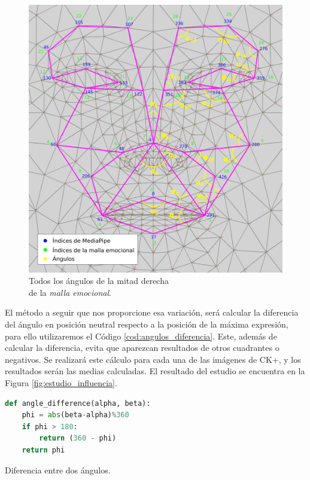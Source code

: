 \begin{figure} [h!]
  \begin{center}
    \includegraphics[width=13cm]{figs/emotional_mesh_todos_angulos.png}
  \end{center}
  \captionsetup{justification=centering}
  \caption{Todos los ángulos de la mitad derecha\\
  de la \textit{malla emocional}.}
  \label{fig:emotional_mesh_todos_angulos}
\end{figure}

El método a seguir que nos proporcione esa variación, será calcular la diferencia del ángulo en posición neutral respecto a la posición de la máxima expresión, para ello utilizaremos el Código \ref{cod:angulos_diferencia}. Este, además de calcular la diferencia, evita que aparezcan resultados de otros cuadrantes o negativos. Se realizará este cálculo para cada una de las imágenes de CK+, y los resultados serán las medias calculadas. El resultado del estudio se encuentra en la Figura \ref{fig:estudio_influencia}.\\

\begin{code}[h]
\begin{lstlisting}[language=Python]
def angle_difference(alpha, beta):
    phi = abs(beta-alpha)%360
    if phi > 180:
        return (360 - phi)
    return phi
\end{lstlisting}
\captionsetup{justification=centering}
\caption[Diferencia entre dos ángulos.]{Diferencia entre dos ángulos.}
\label{cod:angulos_diferencia}
\end{code}

